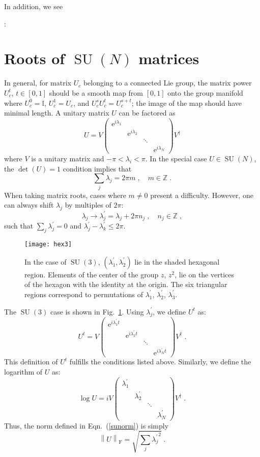 \documentclass[preprint,aps,prd]{revtex4-2}
\newcommand{\da}{\dagger}  %
\newcommand{\be}{\begin{equation}}
\newcommand{\eq}{\end{equation}}
\newcommand{\integer}{\mathbb{Z}}       %
\DeclareMathOperator{\SU}{SU}
\newcommand\fnorm[1]{\left\lVert #1 \right\rVert_\mathrm{F}}
\begin{document}
In addition, we see 

\vspace{10mm}
:

\appendix

\section{Roots of $\SU(N)$ matrices}
\label{roots}

In general, for matrix $U_c$ belonging to a connected Lie group,
the matrix power $U_c^t$, $t\in[0,1]$ should be a
smooth map from $[0,1]$ onto the group manifold where
$U_c^0=\mathbb{I}$, $U_c^1=U_c$, and $U_c^s U_c^t = U_c^{s+t}$;
the image of the map should have minimal length.
A unitary matrix $U$ can be factored as
%
\be
U = V \begin{pmatrix}
    \mathrm{e}^{i \lambda_1} & & &\\
    & \mathrm{e}^{i \lambda_2} & &\\
    & & \ddots & \\
    & & & \mathrm{e}^{i \lambda_N}\end{pmatrix} V^\da
\eq
%
where $V$ is a unitary matrix and $-\pi < \lambda_i < \pi$.
In the special case $U \in \SU(N)$, the $\det(U)=1$ condition implies that
\be
\sum_j \lambda_j = 2 \pi m\;, \quad m\in\integer \;.
\eq
When taking matrix roots, cases where $m\neq 0$ present a
difficulty.  However, one can always shift $\lambda_j$ by
multiples of $2\pi$:
\be
\lambda_j \to \lambda_j^\prime = \lambda_j + 2 \pi n_j\;,\quad
n_j\in\integer \; ,
\eq
such that $\sum_j \lambda_j^\prime = 0$ and
$\lambda_j^\prime - \lambda_k^\prime \le 2 \pi$.
%
\begin{figure}
\texttt{[image: hex3]}
\caption{In the case of $\SU(3)$, $(\lambda_1^\prime,\lambda_2^\prime)$
  lie in the shaded hexagonal region.
  Elements of the center of the group $z$, $z^2$, lie on the vertices
  of the hexagon with the identity at the origin.
  The six triangular regions correspond to permutations of
  $\lambda_1^\prime$, $\lambda_2^\prime$, $\lambda_3^\prime$.   \label{hexagon}}
\end{figure}
%
The $\SU(3)$ case is shown in Fig.~\ref{hexagon}.
Using $\lambda_j^\prime$, we define $U^t$ as:
\be
U^t = V \begin{pmatrix}
    \mathrm{e}^{i\lambda_1^\prime t} & & &\\
    & \mathrm{e}^{i\lambda_2^\prime t} & &\\
    & & \ddots & \\
    & & & \mathrm{e}^{i\lambda_N^\prime t}\end{pmatrix} V^\da \; .
\eq
This definition of $U^t$ fulfills the conditions listed above.
Similarly, we define the logarithm of $U$ as:
\be
\log U = i V \begin{pmatrix}
    \lambda_1^\prime & & &\\
    & \lambda_2^\prime & &\\
    & & \ddots & \\
    & & & \lambda_N^\prime\end{pmatrix} V^\da \; .
\eq
Thus, the norm defined in Eqn.~(\ref{sunorm}) is simply
\be
\fnorm{U} = \sqrt{\sum_j {\lambda_j^\prime}^2} \; .
\eq
\end{document}
